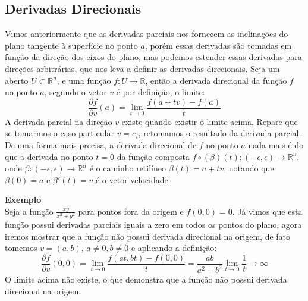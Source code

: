 \subsection{Derivadas Direcionais}

Vimos anteriormente que as derivadas parciais nos fornecem as inclinações do plano tangente à superfície no ponto $a$, porém essas derivadas são tomadas em função da direção dos eixos do plano, mas podemos estender essas derivadas para direções arbitrárias, que nos leva a definir as derivadas direcionais. Seja um aberto $U\subset\mathbb{R}^n$, e uma função $f:U\to\mathbb{R}$, então a derivada direcional da função $f$ no ponto $a$, segundo o vetor $v$ é por definição, o limite:
%
\[
\frac{\partial f}{\partial v}(a) = \lim_{t\to 0} \frac{f(a+tv) - f(a)}{t} 
\]
%
A derivada parcial na direção $v$ existe quando existir o limite acima. Repare que se tomarmos o caso particular $v = e_i$, retomamos o resultado da derivada parcial. De uma forma mais precisa, a derivada direcional de $f$ no ponto $a$ nada mais é do que a derivada no ponto $t=0$ da função composta $f\circ (\beta)(t): (-\epsilon,\epsilon)\to \mathbb{R}^n$, onde $\beta: (-\epsilon,\epsilon)\to\mathbb{R}^n$ é o caminho retilíneo $\beta(t) = a + tv$, notando que $\beta(0) = a$ e $\beta'(t) = v$ é o vetor velocidade.

\vspace{0.2cm}\noindent\textbf{Exemplo} 
\\ 
Seja a função $\frac{xy}{x^2 + y^2}$ para pontos fora da origem e $f(0,0) = 0$. Já vimos que esta função possui derivadas parciais iguais a zero em todos os pontos do plano, agora iremos mostrar que a função não possui derivada direcional na origem, de fato tomemos $v = (a,b)$, $a \neq 0, b \neq 0$ e aplicando a definição:
%
\[
\frac{\partial f}{\partial v}(0,0) = \lim_{t \to 0} \frac{f(at,bt) 
- f(0,0)}{t} = \frac{ab}{a^2+b^2}\lim_{t\to 0}\frac{1}{t} \to \infty
\]
%
O limite acima não existe, o que demonstra que a função não possui derivada direcional na origem.



